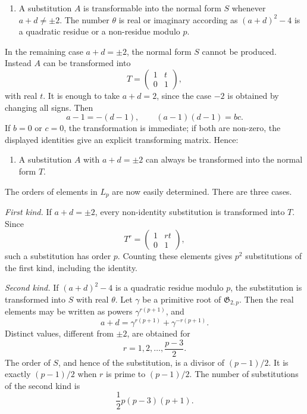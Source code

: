 \documentclass[11pt,a4paper]{book}
\begin{document}
\begin{enumerate}[label=\arabic*.]
\item A substitution \(A\) is transformable into the normal form \(S\) whenever \(a+d\ne\pm2\).  The number \(\theta\) is real or imaginary according as \((a+d)^2-4\) is a quadratic residue or a non-residue modulo \(p\).
\end{enumerate}

In the remaining case \(a+d=\pm2\), the normal form \(S\) cannot be produced.  Instead \(A\) can be transformed into
\begin{equation}\label{eq:68-6}
 T=\begin{pmatrix}1&t\\0&1\end{pmatrix},
\end{equation}
with real \(t\).  It is enough to take \(a+d=2\), since the case \(-2\) is obtained by changing all signs.  Then
\begin{equation}\label{eq:68-8}
 a-1=-(d-1),
 \qquad (a-1)(d-1)=bc.
\end{equation}
If \(b=0\) or \(c=0\), the transformation is immediate; if both are non-zero, the displayed identities give an explicit transforming matrix.  Hence:

\begin{enumerate}[label=\arabic*.,resume]
\item A substitution \(A\) with \(a+d=\pm2\) can always be transformed into the normal form \(T\).
\end{enumerate}

The orders of elements in \(L_p\) are now easily determined.  There are three cases.

\emph{First kind.}  If \(a+d=\pm2\), every non-identity substitution is transformed into \(T\).  Since
\[
 T^r=\begin{pmatrix}1&rt\\0&1\end{pmatrix},
\]
such a substitution has order \(p\).  Counting these elements gives \(p^2\) substitutions of the first kind, including the identity.

\emph{Second kind.}  If \((a+d)^2-4\) is a quadratic residue modulo \(p\), the substitution is transformed into \(S\) with real \(\theta\).  Let \(\gamma\) be a primitive root of \(\mathfrak G_{2,p}\).  Then the real elements may be written as powers \(\gamma^{r(p+1)}\), and
\begin{equation}\label{eq:68-9}
 a+d=\gamma^{r(p+1)}+\gamma^{-r(p+1)}.
\end{equation}
Distinct values, different from \(\pm2\), are obtained for
\begin{equation}\label{eq:68-10}
 r=1,2,\ldots,\frac{p-3}{2}.
\end{equation}
The order of \(S\), and hence of the substitution, is a divisor of \((p-1)/2\).  It is exactly \((p-1)/2\) when \(r\) is prime to \((p-1)/2\).  The number of substitutions of the second kind is
\begin{equation}\label{eq:68-count2}
 \frac12p(p-3)(p+1).
\end{equation}
\end{document}
